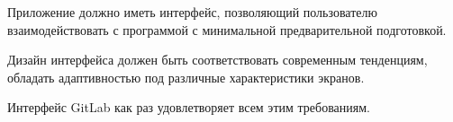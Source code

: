 Приложение должно иметь интерфейс, позволяющий пользователю взаимодействовать с программой с минимальной предварительной
подготовкой.

Дизайн интерфейса должен быть соответствовать современным тенденциям, обладать адаптивностью под различные
характеристики экранов.

Интерфейс GitLab как раз удовлетворяет всем этим требованиям.